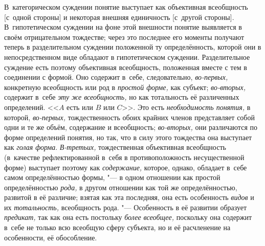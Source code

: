 В~категорическом суждении понятие выступает как объективная
всеобщность [с~одной стороны] и некоторая внешняя единичность [с~другой
стороны]. В~гипотетическом суждении на фоне этой внешности понятие
выявляется в своём отрицательном тождестве; через это последнее его моменты
получают теперь в разделительном суждении положенной ту определённость,
которой они в непосредственном виде обладают в гипотетическом суждении.
Разделительное суждение есть поэтому объективная всеобщность, положенная
вместе с тем в соединении с формой. Оно содержит в~себе, следовательно,
{\em во-первых,} конкретную всеобщность или род в {\em простой форме,} как
субъект; {\em во-вторых,} содержит в~себе {\em эту
же всеобщность,} но как тотальность её
различенных определений. <<$A$ есть или $B$ или $C$>>. Это есть
{\em необходимость понятия,} в которой, {\em во-первых,}
тождественность обоих крайних членов представляет собой одни
и те же объём, содержание и всеобщность;
{\em во-вторых,} они
различаются по форме определений понятия, но так, что в силу этого
тождества она выступает как {\em голая
форма}. {\em В-третьих,}
тождественная объективная всеобщность (в~качестве
рефлектированной в~себя в противоположность несущественной форме) выступает
поэтому как {\em содержание,}
которое, однако, обладает в~себе самом определённостью
формы, "--- в одном отношении как простой определённостью
{\em рода,} в другом
отношении как той же определённостью, развитой в её различие; взятая как
эта последняя, она есть особенность {\em видов} и их {\em тотальность,}
всеобщность рода. "--- Особенность в её развитии
образует {\em предикат,} так как она есть постольку {\em более всеобщее,}
поскольку она содержит в~себе не только всю всеобщую сферу
субъекта, но и её расчленение на особенности, её обособление.

